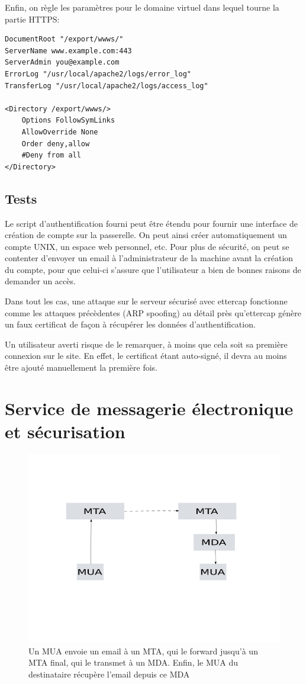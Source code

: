 \documentclass[a4paper]{article}
\begin{document}
Enfin, on règle les paramètres pour le domaine virtuel dans lequel
tourne la partie HTTPS:
\begin{verbatim}
DocumentRoot "/export/wwws/"
ServerName www.example.com:443
ServerAdmin you@example.com
ErrorLog "/usr/local/apache2/logs/error_log"
TransferLog "/usr/local/apache2/logs/access_log"

<Directory /export/wwws/>
    Options FollowSymLinks
    AllowOverride None
    Order deny,allow
    #Deny from all
</Directory>
\end{verbatim}

\subsection{Tests}
Le script d'authentification fourni peut être étendu pour
fournir une interface de création de compte sur la passerelle.
On peut ainsi créer automatiquement un compte UNIX, un espace
web personnel, etc. Pour plus de sécurité, on peut se contenter
d'envoyer un email à l'administrateur de la machine avant la
création du compte, pour que celui-ci s'assure que l'utilisateur
a bien de bonnes raisons de demander un accès.

Dans tout les cas, une attaque sur le serveur sécurisé avec
ettercap fonctionne comme les attaques précèdentes (ARP spoofing)
au détail près qu'ettercap génère un faux certificat de façon
à récupérer les données d'authentification.

Un utilisateur averti risque de le remarquer, à moins que cela
soit sa première connexion sur le site. En effet, le certificat
étant auto-signé, il devra au moins être ajouté manuellement
la première fois.
\section{Service de messagerie électronique et sécurisation}
\begin{figure}[!ht]
	\centering
	\includegraphics[scale=.5]{emailrouting.png}
	\caption{\label{emailrouting} Un MUA envoie un email à un MTA, qui
		le forward jusqu'à un MTA final, qui le transmet à un MDA.
		Enfin, le MUA du destinataire récupère l'email depuis ce MDA}
\end{figure}
\end{document}
